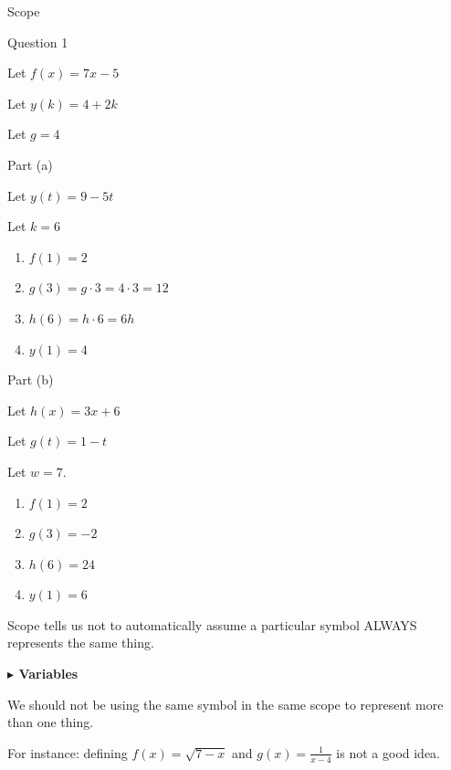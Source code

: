 \documentclass{ximera}
\begin{document}
\begin{example} Scope



\begin{model} Question 1

Let $f(x) = 7x - 5$  

Let $y(k) = 4 + 2k$

Let $g = 4$

	\begin{model} Part (a)

	Let $y(t) = 9 - 5t$

	Let $k = 6$
		\begin{enumerate}
			\item $f(1) = 2$
			\item $g(3) = g \cdot 3 = 4 \cdot 3 = 12$
			\item $h(6) = h \cdot 6 = 6h$
			\item $y(1) = 4$
		\end{enumerate}
	\end{model} 


	\begin{model} Part (b)

	Let $h(x) = 3x + 6$

	Let $g(t) = 1 - t$

	Let $w = 7$.

		\begin{enumerate}
			\item $f(1) = 2$
			\item $g(3) = -2$
			\item $h(6) = 24$
			\item $y(1) = 6$
		\end{enumerate}
	\end{model} 

\end{model}


\end{example}

Scope tells us not to automatically assume a particular symbol ALWAYS represents the same thing. 





\textbf{\textcolor{blue!55!black}{$\blacktriangleright$ Variables}}

We should not be using the same symbol in the same scope to represent more than one thing.

For instance: defining $f(x) = \sqrt{7-x}$ and $g(x) = \frac{1}{x-4}$ is not a good idea.
\end{document}
